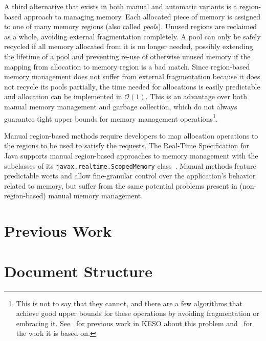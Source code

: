 		A third alternative that exists in both manual and automatic variants is a region-based approach to managing memory.
		Each allocated piece of memory is assigned to one of many memory regions (also called \emph{pools}). Unused regions
		are reclaimed as a whole, avoiding external fragmentation completely. A pool can only be safely recycled if all
		memory allocated from it is no longer needed, possibly extending the lifetime of a pool and preventing re-use of
		otherwise unused memory if the mapping from allocation to memory region is a bad match. Since region-based memory
		management does not suffer from external fragmentation because it does not recycle its pools partially, the time
		needed for allocations is easily predictable and allocation can be implemented in $\mathcal O(1)$. This is an
		advantage over both manual memory management and garbage collection, which do not always guarantee tight upper
		bounds for memory management operations\footnote{This is not to say that they cannot, and there are a few algorithms
		that achieve good upper bounds for these operations by avoiding fragmentation or embracing it. See~\cite{strotz:14}
		for previous work in KESO about this problem and~\cite{pizlo:10:pldi} for the work it is based on.}.

		Manual region-based methods require developers to map allocation operations to the regions to be used to satisfy the
		requests. The Real-Time Specification for Java supports manual region-based approaches to memory management with the
		subclasses of its \texttt{javax.realtime.ScopedMemory} class~\cite{rtsj:06:scoped}. Manual methods feature
		predictable \glspl{wcet} and allow fine-granular control over the application's behavior related to memory, but
		suffer from the same potential problems present in (non-region-based) manual memory management.


	\section{Previous Work}
		\label{sec:intro:prev}

	\section{Document Structure}
		\label{sec:intro:document-structure}
